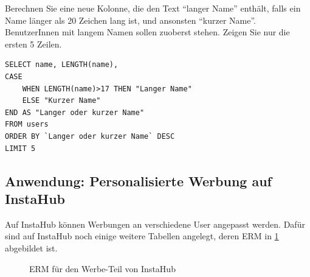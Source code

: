 \begin{myexercise}
  Berechnen Sie eine neue Kolonne, die den Text ``langer Name'' enthält, falls ein Name länger als 20 Zeichen lang ist, und ansonsten ``kurzer Name''. BenutzerInnen mit langem Namen sollen zuoberst stehen. Zeigen Sie nur die ersten 5 Zeilen.
  \begin{myanswer}
    \begin{lstlisting}[style=sql]
SELECT name, LENGTH(name),
CASE
	WHEN LENGTH(name)>17 THEN "Langer Name"
    ELSE "Kurzer Name"
END AS "Langer oder kurzer Name"
FROM users
ORDER BY `Langer oder kurzer Name` DESC
LIMIT 5
\end{lstlisting}
  \end{myanswer}
\end{myexercise}

\subsection{Anwendung: Personalisierte Werbung auf InstaHub}

Auf InstaHub können Werbungen an verschiedene User angepasst werden. Dafür sind auf InstaHub noch einige weitere Tabellen angelegt, deren \gls{ERM} in \cref{fig:erm-ads} abgebildet ist.

\begin{figure}[H]
  \centering
  \caption{\gls{ERM} für den Werbe-Teil von InstaHub}
  \label{fig:erm-ads}
\end{figure}

